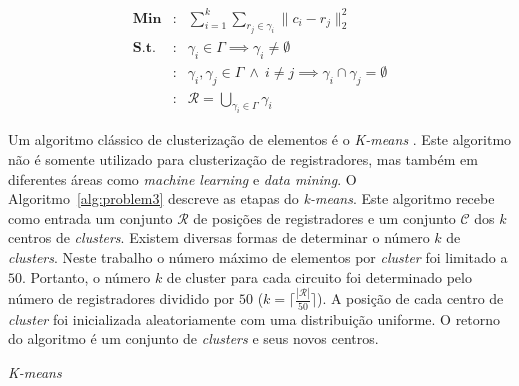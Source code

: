 \begin{eqnarray}
\label{eq:register_clustering}
    \textbf{Min}&:& \sum_{i = 1}^{k}\sum_{r_j \in \gamma_i} \lVert c_i - r_j\rVert_2^2 \\
    \label{eq:empty_constraint}
    \textbf{S.t.} &:& \gamma_i \in \Gamma \implies \gamma_i \neq \emptyset \\
    \label{eq:intersection_constraint}
    &:&\gamma_i, \gamma_j \in \Gamma \ \land \ i \neq j \implies \gamma_i \cap \gamma_j = \emptyset\\
    \label{eq:union_constraint}
    &:& \mathcal{R} = \bigcup_{\gamma_i \in \Gamma} \gamma_i 
\end{eqnarray}

Um algoritmo clássico de clusterização de elementos é o \textit{K-means} \cite{selim1984k}.
Este algoritmo não é somente utilizado para clusterização de registradores, mas também em diferentes áreas como \textit{machine learning} e \textit{data mining}.
O Algoritmo~\ref{alg:problem3} descreve as etapas do \textit{k-means}.
Este algoritmo recebe como entrada um conjunto $\mathcal{R}$ de posições de registradores e um conjunto $\mathcal{C}$ dos $k$ centros de \textit{clusters}.
Existem diversas formas de determinar o número $k$ de \textit{clusters}. Neste trabalho o número máximo de elementos por \textit{cluster} foi limitado a $50$.
Portanto, o número $k$ de cluster para cada circuito foi determinado pelo número de registradores dividido por $50$ ($k=\lceil\frac{|\mathcal{R}|}{50}\rceil$).
A posição de cada centro de \textit{cluster} foi inicializada aleatoriamente com uma distribuição uniforme.
O retorno do algoritmo é um conjunto de \textit{clusters} e seus novos centros.

\begin{algorithm}[bht]
\LinesNumbered
  \caption{\textit{K-means}} \label{alg:problem3}
\end{algorithm}

